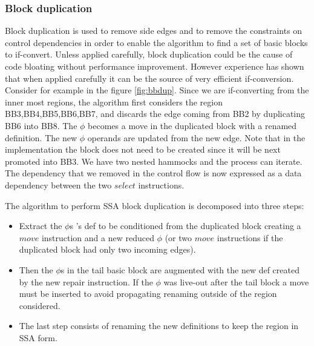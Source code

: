 \subsubsection{Block duplication}

Block duplication is used to remove side edges and to remove the constraints on control dependencies in order to enable the algorithm to find a set of basic blocks to if-convert. Unless applied carefully, block duplication could be the cause of code bloating without performance improvement. However experience has shown that when applied carefully it can be the source of very efficient if-conversion. 
Consider for example in the figure \ref{fig:bbdup}. Since we are if-converting from the inner most regions, the algorithm first considers the region {BB3,BB4,BB5,BB6,BB7}, and discards the edge coming from BB2 by duplicating BB6 into BB8. The $\phi$ becomes a move in the duplicated block with a renamed definition. The new $\phi$ operands are updated from the new edge. Note that in the implementation the block does not need to be created since it will be next promoted into BB3. We have two nested hammocks and the process can iterate. The dependency that we removed in the control flow is now expressed as a data dependency between the two $select$ instructions.

The algorithm to perform SSA block duplication is decomposed into three steps: 
\begin{itemize}
\item Extract the $\phi$s 's def to be conditioned from the duplicated block creating a $move$ instruction and a new reduced $\phi$ (or two $move$ instructions if the duplicated block had only two incoming edges).
\item Then the $\phi$s in the tail basic block are augmented with the new def created by the new repair instruction. If the $\phi$ was live-out after the tail block a move must be inserted to avoid propagating renaming outside of the region considered. 
\item The last step consists of renaming the new definitions to keep the region in SSA form.
\end{itemize}

